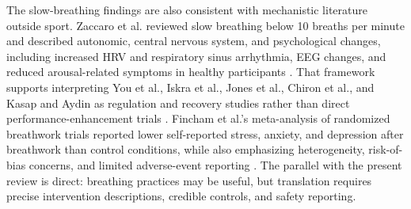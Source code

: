 \documentclass[12pt,a4paper]{article}
\begin{document}
The slow-breathing findings are also consistent with mechanistic literature outside sport. Zaccaro et al. reviewed slow breathing below 10 breaths per minute and described autonomic, central nervous system, and psychological changes, including increased HRV and respiratory sinus arrhythmia, EEG changes, and reduced arousal-related symptoms in healthy participants \parencite{zaccaro_how_2018}. That framework supports interpreting You et al., Iskra et al., Jones et al., Chiron et al., and Kasap and Aydin as regulation and recovery studies rather than direct performance-enhancement trials \parencite{you_m_and_laborde_s_and_ackermann_s_and_borges_u_and_dosseville_f_and_mosley_e_influence_2024,iskra_m_and_laborde_s_and_poppa_t_and_salvotti_c_and_weinand_e_and_raab_m_and_voigt_l_specifying_2026,jones_effectiveness_2026,chiron_f_and_guloren_b_and_erblang_m_and_poirier_c_and_elbaz_m_and_servonnet_a_and_gaudin_m_and_le_coz_c_and_lopes_p_and_chennaoui_m_and_hanon_c_and_leger_d_and_thomas_c_exploring_2026,kasap_m_and_aydin_gr_box_2025}. Fincham et al.'s meta-analysis of randomized breathwork trials reported lower self-reported stress, anxiety, and depression after breathwork than control conditions, while also emphasizing heterogeneity, risk-of-bias concerns, and limited adverse-event reporting \parencite{fincham_effect_2023}. The parallel with the present review is direct: breathing practices may be useful, but translation requires precise intervention descriptions, credible controls, and safety reporting.
\end{document}
